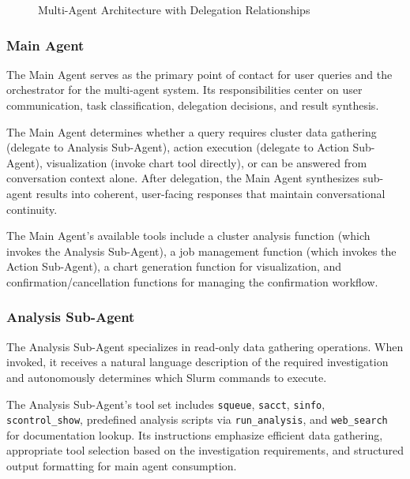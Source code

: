\begin{figure}[H]
    \centering
    \caption{Multi-Agent Architecture with Delegation Relationships}
    \label{fig:multi-agent}
\end{figure}

\subsubsection{Main Agent}

The Main Agent serves as the primary point of contact for user queries and the orchestrator for the multi-agent system. Its responsibilities center on user communication, task classification, delegation decisions, and result synthesis.

The Main Agent determines whether a query requires cluster data gathering (delegate to Analysis Sub-Agent), action execution (delegate to Action Sub-Agent), visualization (invoke chart tool directly), or can be answered from conversation context alone. After delegation, the Main Agent synthesizes sub-agent results into coherent, user-facing responses that maintain conversational continuity.

The Main Agent's available tools include a cluster analysis function (which invokes the Analysis Sub-Agent), a job management function (which invokes the Action Sub-Agent), a chart generation function for visualization, and confirmation/cancellation functions for managing the confirmation workflow.

\subsubsection{Analysis Sub-Agent}

The Analysis Sub-Agent specializes in read-only data gathering operations. When invoked, it receives a natural language description of the required investigation and autonomously determines which Slurm commands to execute.

The Analysis Sub-Agent's tool set includes \texttt{squeue}, \texttt{sacct}, \texttt{sinfo}, \texttt{scontrol\_show}, predefined analysis scripts via \texttt{run\_analysis}, and \texttt{web\_search} for documentation lookup. Its instructions emphasize efficient data gathering, appropriate tool selection based on the investigation requirements, and structured output formatting for main agent consumption.


